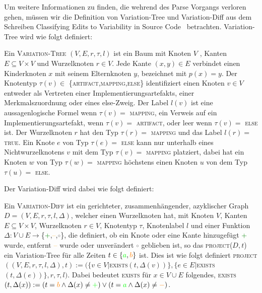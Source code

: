  
Um weitere Informationen zu finden, die wehrend des Parse Vorgangs verloren gehen, müssen wir die Definition von Variation-Tree und Variation-Diff aus dem Schreiben Classifying Edits to Variability in Source Code~\citet{BTS+:ESECFSE22}
 betrachten. Variation-Tree wird wie folgt definiert:
 \begin{definition}
 	Ein \textsc{Variation-Tree}  $(V,E,r,\tau,l)$ ist ein Baum mit Knoten $V$ , Kanten $E \subseteq V \times V$ und Wurzelknoten $r \in V$. Jede Kante $(x,y) \in E$ verbindet einen Kinderknoten $x$ mit seinem Elternknoten $y$, bezeichnet mit $p(x) = y$. Der Knotentyp $\tau(v) \in $ \{\textsc{artifact,mapping,else}\} identifiziert einen Knoten $v \in V$ entweder als Vertreten einer Implementierungsartefakts, einer Merkmalszuordnung oder eines else-Zweig. Der Label $l(v)$ ist eine aussagenlogische Formel wenn $\tau(v) =$ \textsc{mapping}, ein Verweis auf ein Implementierungsartefakt, wenn $\tau(v) = $ \textsc{artifact}, oder leer wenn $\tau(v) =$ \textsc{else} ist. Der Wurzelknoten $r$ hat den Typ $\tau(r) =$ \textsc{mapping} und das Label $l(r) = $ \textsc{true}. Ein Knote $e$ von Typ $\tau(e) =$ \textsc{else} kann nur unterhalb eines Nichtwurzelknotens $v$ mit dem Typ $\tau(v) =$ \textsc{mapping} platziert, dabei hat ein Knoten $w$ von Typ $\tau(w) =$ \textsc{mapping} höchstens einen Knoten $u$ von dem Typ $\tau(u) =$ \textsc{else}.
 \end{definition}
  Der Variation-Diff wird dabei wie folgt definiert:
  \begin{definition}
  	Ein \textsc{Variation-Diff} ist ein gerichteter, zusammenhängender, azyklischer Graph $D=(V,E,r,\tau,l,\Delta) $, welcher einen Wurzelknoten hat, mit Knoten $V$, Kanten $E \subseteq V \times V$, Wurzelknoten $r \in V$, Knotentyp $\tau$, Knotenlabel $l$ und einer Funktion $\Delta : V \cup E \to $\{\textcolor{green}{+},\textcolor{orange}{--},\textcolor{gray}{$\circ$}\}, die definiert, ob ein Knote oder eine Kante hinzugefügt \textcolor{green}{+} wurde, entfernt \textcolor{orange}{--} wurde oder unverändert \textcolor{gray}{$\circ$} geblieben ist, so das \textsc{project}($D,t$) ein Variation-Tree für alle Zeiten $t \in \{\textcolor{green}{a},\textcolor{orange}{b}\}$ ist. Dies ist wie folgt definiert \textsc{project}$((V,E,r,\tau,l,\Delta),t) := (\{v \in V | $\textsc{exists}$(t,\Delta(v))\},\{e \in E | $\textsc{exists}$(t,\Delta(e))\},r,\tau,l)$. Dabei bedeutet \textsc{exists} für $x \in V \cup E$ folgendes, \textsc{exists}$(t,\Delta(x)) := (t = \textcolor{orange}{b} \land \Delta(x) \neq \textcolor{green}{+}) \lor (t = \textcolor{green}{a} \land \Delta(x) \neq \textcolor{orange}{-})$.
  \end{definition}
    
